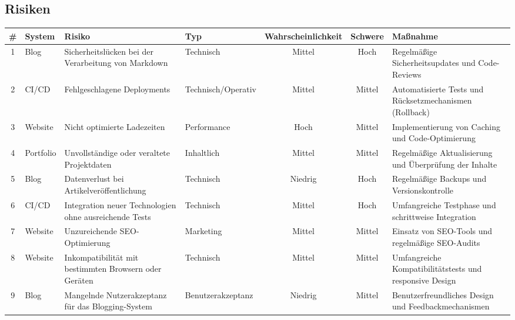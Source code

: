 \begin{landscape}
    \subsection{ Risiken }
\begin{table}[h!]
    \centering
    \begin{tabular}{|c|l|p{6cm}|l|c|c|p{6cm}|}
    \hline
    \# & System      & Risiko                                                & Typ                & Wahrscheinlichkeit & Schwere  & Maßnahme                                                    \\ \hline
    1  & Blog        & Sicherheitslücken bei der Verarbeitung von Markdown   & Technisch          & Mittel             & Hoch     & Regelmäßige Sicherheitsupdates und Code-Reviews             \\ \hline
    2  & CI/CD       & Fehlgeschlagene Deployments                           & Technisch/Operativ & Mittel             & Mittel   & Automatisierte Tests und Rücksetzmechanismen (Rollback)     \\ \hline
    3  & Website     & Nicht optimierte Ladezeiten                           & Performance        & Hoch               & Mittel   & Implementierung von Caching und Code-Optimierung            \\ \hline
    4  & Portfolio   & Unvollständige oder veraltete Projektdaten            & Inhaltlich         & Mittel             & Mittel   & Regelmäßige Aktualisierung und Überprüfung der Inhalte      \\ \hline
    5  & Blog        & Datenverlust bei Artikelveröffentlichung              & Technisch          & Niedrig            & Hoch     & Regelmäßige Backups und Versionskontrolle                   \\ \hline
    6  & CI/CD       & Integration neuer Technologien ohne ausreichende Tests& Technisch          & Mittel             & Hoch     & Umfangreiche Testphase und schrittweise Integration         \\ \hline
    7  & Website     & Unzureichende SEO-Optimierung                         & Marketing          & Mittel             & Mittel   & Einsatz von SEO-Tools und regelmäßige SEO-Audits            \\ \hline
    8  & Website     & Inkompatibilität mit bestimmten Browsern oder Geräten & Technisch          & Mittel             & Mittel   & Umfangreiche Kompatibilitätstests und responsive Design     \\ \hline
    9  & Blog        & Mangelnde Nutzerakzeptanz für das Blogging-System     & Benutzerakzeptanz  & Niedrig            & Mittel   & Benutzerfreundliches Design und Feedbackmechanismen         \\ \hline

\end{tabular}
\end{table}
\end{landscape}
